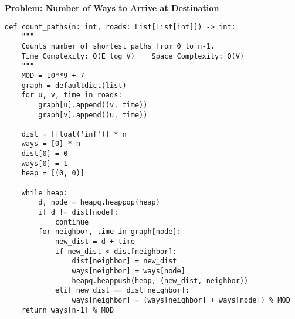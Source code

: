 \noindent\textbf{Problem: Number of Ways to Arrive at Destination}
\begin{verbatim}
def count_paths(n: int, roads: List[List[int]]) -> int:
    """
    Counts number of shortest paths from 0 to n-1.
    Time Complexity: O(E log V)    Space Complexity: O(V)
    """
    MOD = 10**9 + 7
    graph = defaultdict(list)
    for u, v, time in roads:
        graph[u].append((v, time))
        graph[v].append((u, time))
    
    dist = [float('inf')] * n
    ways = [0] * n
    dist[0] = 0
    ways[0] = 1
    heap = [(0, 0)]
    
    while heap:
        d, node = heapq.heappop(heap)
        if d != dist[node]:
            continue
        for neighbor, time in graph[node]:
            new_dist = d + time
            if new_dist < dist[neighbor]:
                dist[neighbor] = new_dist
                ways[neighbor] = ways[node]
                heapq.heappush(heap, (new_dist, neighbor))
            elif new_dist == dist[neighbor]:
                ways[neighbor] = (ways[neighbor] + ways[node]) % MOD
    return ways[n-1] % MOD
\end{verbatim}
% 
